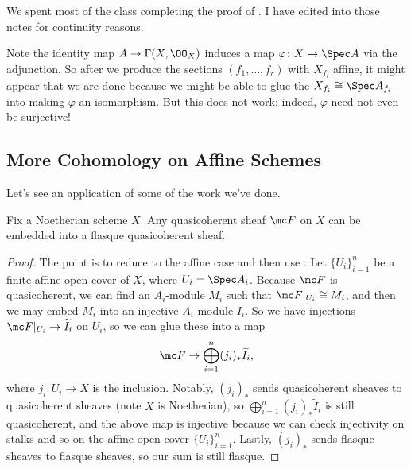 \documentclass[../notes.tex]{subfiles}
\begin{document}
We spent most of the class completing the proof of . I have edited into those notes for continuity reasons.
\begin{remark}
	Note the identity map $A\to\Gamma(X,\OO_X)$ induces a map $\varphi\colon X\to\Spec A$ via the adjunction. So after we produce the sections $(f_1,\ldots,f_r)$ with $X_{f_i}$ affine, it might appear that we are done because we might be able to glue the $X_{f_i}\cong\Spec A_{f_i}$ into making $\varphi$ an isomorphism. But this does not work: indeed, $\varphi$ need not even be surjective!
\end{remark}

\subsection{More Cohomology on Affine Schemes}
Let's see an application of some of the work we've done.
\begin{corollary} \label{cor:embed-to-qcoh-flasque}
	Fix a Noetherian scheme $X$. Any quasicoherent sheaf $\mc F$ on $X$ can be embedded into a flasque quasicoherent sheaf.
\end{corollary}
\begin{proof}
	The point is to reduce to the affine case and then use . Let $\{U_i\}_{i=1}^n$ be a finite affine open cover of $X$, where $U_i=\Spec A_i$. Because $\mc F$ is quasicoherent, we can find an $A_i$-module $M_i$ such that $\mc F|_{U_i}\cong M_i$, and then we may embed $M_i$ into an injective $A_i$-module $I_i$. So we have injections $\mc F|_{U_i}\to\widetilde I_i$ on $U_i$, so we can glue these into a map
	\[\mc F\to\bigoplus_{i=1}^n(j_i)_*\widetilde I_i,\]
	where $j_i\colon U_i\to X$ is the inclusion. Notably, $(j_i)_*$ sends quasicoherent sheaves to quasicoherent sheaves (note $X$ is Noetherian), so $\bigoplus_{i=1}^n(j_i)_*\widetilde I_i$ is still quasicoherent, and the above map is injective because we can check injectivity on stalks and so on the affine open cover $\{U_i\}_{i=1}^n$. Lastly, $(j_i)_*$ sends flasque sheaves to flasque sheaves, so our sum is still flasque.
\end{proof}
\end{document}
